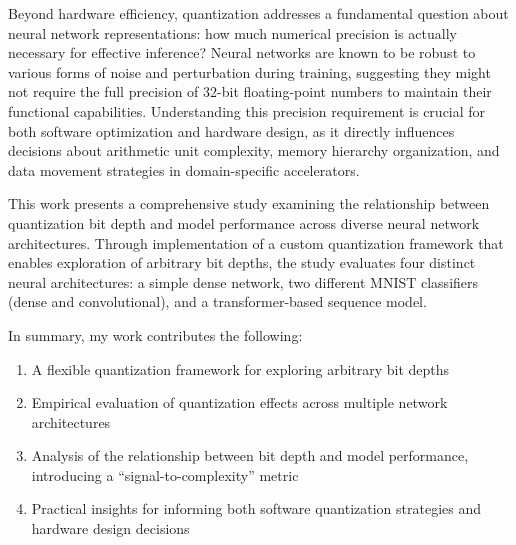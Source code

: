 \documentclass[twocolumn]{article}
\begin{document}
Beyond hardware efficiency, quantization addresses a fundamental question about
neural network representations: how much numerical precision is actually
necessary for effective inference? Neural networks are known to be robust to
various forms of noise and perturbation during training, suggesting they might
not require the full precision of 32-bit floating-point numbers to maintain
their functional capabilities. Understanding this precision requirement is
crucial for both software optimization and hardware design, as it directly
influences decisions about arithmetic unit complexity, memory hierarchy
organization, and data movement strategies in domain-specific accelerators.

This work presents a comprehensive study examining the relationship between
quantization bit depth and model performance across diverse neural network
architectures. Through implementation of a custom quantization framework that
enables exploration of arbitrary bit depths, the study evaluates four distinct
neural architectures: a simple dense network, two different MNIST classifiers
(dense and convolutional), and a transformer-based sequence model.

In summary, my work contributes the following:
\begin{enumerate}
\item A flexible quantization framework for exploring arbitrary bit depths
\item Empirical evaluation of quantization effects across multiple network architectures
\item Analysis of the relationship between bit depth and model performance, introducing a ``signal-to-complexity'' metric
\item Practical insights for informing both software quantization strategies and hardware design decisions
\end{enumerate}


\printbibliography
\end{document}
